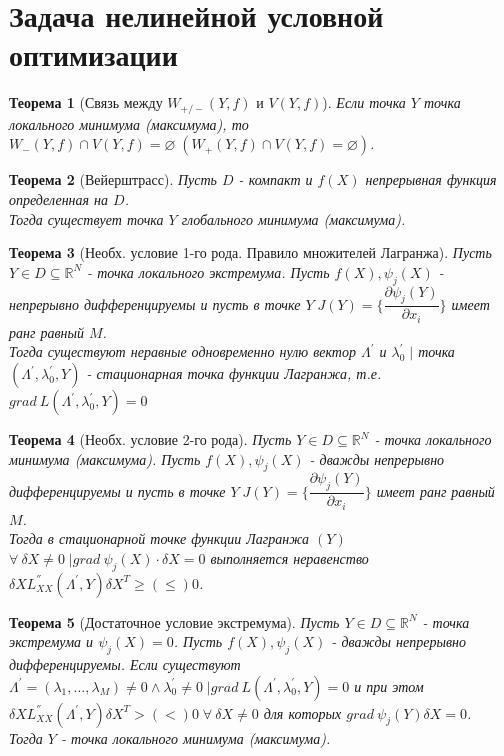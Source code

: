\documentclass[12pt]{article}
\newtheorem{theorem}{Теорема}[section]
\theoremstyle{definition}
\theoremstyle{remark}
\begin{document}
\section{Задача нелинейной условной оптимизации}
\begin{theorem}[Связь между $W_{+/-}(Y,f)$ и $V(Y,f)$]
Если точка $Y$ точка локального минимума (максимума), то $W_-(Y,f)\cap V(Y,f)= \varnothing \;(W_+(Y,f)\cap V(Y,f)= \varnothing) $.
\end{theorem}
\begin{theorem}[Вейерштрасс]
  Пусть $D$ - компакт и $f(X)$ непрерывная функция определенная на $D$.\\
  Тогда существует точка $Y$ глобального минимума (максимума).
\end{theorem}
\begin{theorem}[Необх. условие 1-го рода. Правило множителей Лагранжа]
  Пусть $Y\in D\subseteq \mathbb{R}^N$ - точка локального экстремума. Пусть $f(X),\psi_j(X)$ - непрерывно дифференцируемы и пусть
  в точке $Y\; J(Y)=\bigg\{\dfrac{\partial \psi_j(Y)}{\partial x_i}\bigg\}$ имеет ранг равный $M$.\\
  Тогда существуют неравные одновременно нулю вектор $\Lambda^{'}$ и $\lambda_0^{'}\;\big|$ точка $(\Lambda^{'},\lambda_0^{'},Y)$ - стационарная точка функции Лагранжа, т.е. $grad\:L(\Lambda^{'},\lambda_0^{'},Y)=0$
\end{theorem}
\begin{theorem}[Необх. условие 2-го рода]
  Пусть $Y\in D\subseteq \mathbb{R}^N$ - точка локального минимума (максимума). Пусть $f(X),\psi_j(X)$ - дважды непрерывно дифференцируемы и пусть
  в точке $Y\; J(Y)=\bigg\{\dfrac{\partial \psi_j(Y)}{\partial x_i}\bigg\}$ имеет ранг равный $M$.\\
  Тогда в стационарной точке функции Лагранжа $(Y)$ $ \forall\:\delta X\neq 0 \;\big| grad\:\psi_j(X)\cdot\delta X=0$ выполняется неравенство
  $\delta X L_{XX}^{''}(\Lambda^{'},Y)\delta X^{T}\geqslant (\leqslant) 0$.
\end{theorem}
\begin{theorem}[Достаточное условие экстремума]
  Пусть $Y\in D\subseteq \mathbb{R}^N$ - точка экстремума и $\psi_j(X)=0$. Пусть $f(X),\psi_j(X)$ - дважды непрерывно дифференцируемы. Если
  существуют $\Lambda^{'}=(\lambda_1,...,\lambda_M)\neq 0 \land \lambda_0^{'}\neq 0\;\big| grad\:L(\Lambda^{'},\lambda_0^{'},Y)=0$ и при этом
  $ \delta X L_{XX}^{''}(\Lambda^{'},Y)\delta X^{T}>(<) 0\; \forall\:\delta X\neq 0$ для которых $grad\:\psi_j(Y)\delta X =0$.\\
  Тогда $Y$ - точка локального минимума (максимума).
\end{theorem}
\end{document}
